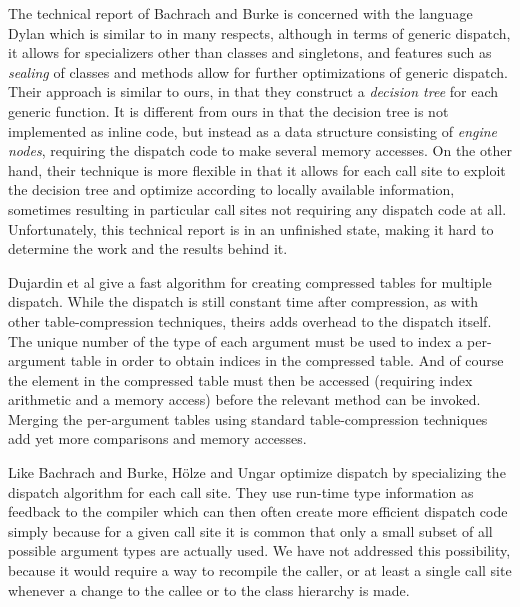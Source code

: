 The technical report of Bachrach and Burke \cite{Bachrach:2000} is
concerned with the language Dylan which is similar to \cl{} in many
respects, although in terms of generic dispatch, it allows for
specializers other than classes and singletons, and features such as
\emph{sealing} of classes and methods allow for further optimizations
of generic dispatch.  Their approach is similar to ours, in that they
construct a \emph{decision tree} for each generic function.  It is
different from ours in that the decision tree is not implemented as
inline code, but instead as a data structure consisting of
\emph{engine nodes}, requiring the dispatch code to make several
memory accesses.  On the other hand, their technique is more flexible
in that it allows for each call site to exploit the decision tree and
optimize according to locally available information, sometimes
resulting in particular call sites not requiring any dispatch code at
all.  Unfortunately, this technical report is in an unfinished state,
making it hard to determine the work and the results behind it.

Dujardin et al \cite{Dujardin:1998:FAC:271510.271521} give a fast
algorithm for creating compressed tables for multiple dispatch.  While
the dispatch is still constant time after compression, as with other
table-compression techniques, theirs adds overhead to the dispatch
itself.  The unique number of the type of each argument must be used
to index a per-argument table in order to obtain indices in the
compressed table.  And of course the element in the compressed table
must then be accessed (requiring index arithmetic and a memory access)
before the relevant method can be invoked.  Merging the per-argument
tables using standard table-compression techniques add yet more
comparisons and memory accesses. 

Like Bachrach and Burke, Hölze and Ungar
\cite{Holzle:1994:ODC:178243.178478} optimize dispatch by specializing
the dispatch algorithm for each call site.  They use run-time type
information as feedback to the compiler which can then often create
more efficient dispatch code simply because for a given call site it
is common that only a small subset of all possible argument types are
actually used.  We have not addressed this possibility, because it
would require a way to recompile the caller, or at least a single call
site whenever a change to the callee or to the class hierarchy is
made.  
